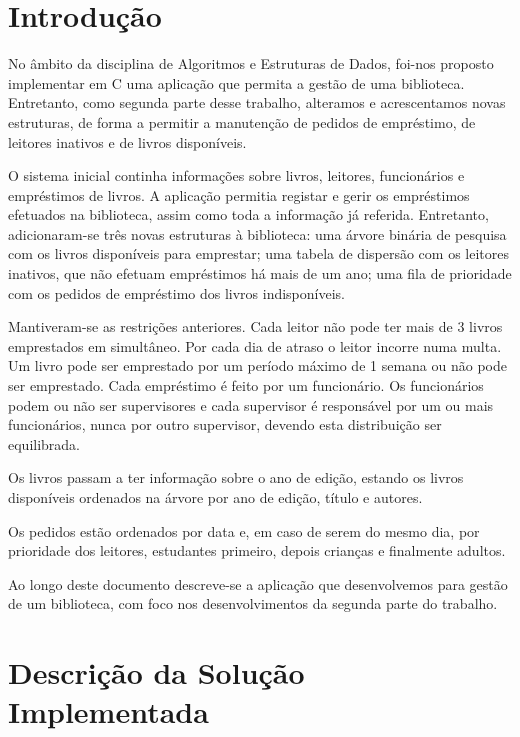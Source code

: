 \documentclass[12pt,a4paper,reqno]{report}
\numberwithin{figure}{section}
\numberwithin{equation}{section}
\def\Cpp{C\raisebox{0.5ex}{\tiny\textbf{++}}}
\begin{document}


\tableofcontents

\chapter{Introdução}

No âmbito da disciplina de Algoritmos e Estruturas de Dados, foi-nos proposto implementar em \Cpp{} uma aplicação que permita a gestão de uma biblioteca. Entretanto, como segunda parte desse trabalho, alteramos e acrescentamos novas estruturas, de forma a permitir a manutenção de pedidos de empréstimo, de leitores inativos e de livros disponíveis.

O sistema inicial continha informações sobre livros, leitores, funcionários e empréstimos de livros. A aplicação permitia registar e gerir os empréstimos efetuados na biblioteca, assim como toda a informação já referida. Entretanto, adicionaram-se três novas estruturas à biblioteca: uma árvore binária de pesquisa com os livros disponíveis para emprestar; uma tabela de dispersão com os leitores inativos, que não efetuam empréstimos há mais de um ano; uma fila de prioridade com os pedidos de empréstimo dos livros indisponíveis.

Mantiveram-se as restrições anteriores. Cada leitor não pode ter mais de 3 livros emprestados em simultâneo. Por cada dia de atraso o leitor incorre numa multa. Um livro pode ser emprestado por um período máximo de 1 semana ou não pode ser emprestado. Cada empréstimo é feito por um funcionário. Os funcionários podem ou não ser supervisores e cada supervisor é responsável por um ou mais funcionários, nunca por outro supervisor, devendo esta distribuição ser equilibrada.

Os livros passam a ter informação sobre o ano de edição, estando os livros disponíveis ordenados na árvore por ano de edição, título e autores.

Os pedidos estão ordenados por data e, em caso de serem do mesmo dia, por prioridade dos leitores, estudantes primeiro, depois crianças e finalmente adultos.

Ao longo deste documento descreve-se a aplicação que desenvolvemos para gestão de um biblioteca, com foco nos desenvolvimentos da segunda parte do trabalho.

\chapter{Descrição da Solução Implementada}
\end{document}
